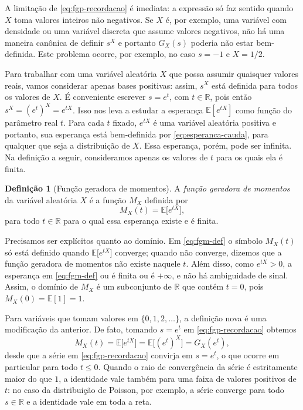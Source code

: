 \documentclass[12pt,portuguese]{article}
\theoremstyle{definition}
\newtheorem{definition}[definition]{Definição}
\theoremstyle{plainexercise}
\theoremstyle{starredexercise}
\theoremstyle{definition}
\begin{document}
A limitação de \eqref{eq:fgp-recordacao} é imediata: a expressão só faz sentido
quando $X$ toma valores inteiros não negativos. Se $X$ é, por exemplo, uma
variável com densidade ou uma variável discreta que assume valores negativos,
não há uma maneira canônica de definir $s^X$ e portanto $G_{X}(s)$ poderia não estar
bem-definida. Este problema ocorre, por exemplo, no caso $s=-1$ e $X=1/2$. 

Para trabalhar com uma variável aleatória $X$ que possa assumir quaisquer
valores reais, vamos considerar apenas bases positivas: assim, $s^X$ está
definida para todos os valores de $X$. É conveniente escrever $s=e^t$, com
$t\in\mathbb{R}$, pois então $s^X=(e^t)^X=e^{tX}$. Isso nos leva a estudar
a esperança $\mathbb{E}[e^{tX}]$ como função do parâmetro real $t$.
Para cada $t$ fixado, $e^{tX}$ é uma variável aleatória positiva e portanto,
sua esperança está bem-definida por \eqref{eq:esperanca-cauda}, para qualquer que
seja a distribuição de $X$. Essa esperança, porém, pode ser infinita.
Na definição a seguir, consideramos apenas os valores de $t$ para os quais
ela é finita.

\begin{definition}[Função geradora de momentos]\label{def:fgm}
A \emph{função geradora de momentos} da variável aleatória $X$ é a função
$M_X$ definida por
\begin{equation}\label{eq:fgm-def}
M_X(t) = \mathbb{E}\bigl[e^{tX}\bigr],
\end{equation}
para todo $t\in\mathbb{R}$ para o qual essa esperança existe e é finita.
\end{definition}

Precisamos ser explícitos quanto ao domínio. Em \eqref{eq:fgm-def} o símbolo
$M_X(t)$ só está definido quando $\mathbb{E}\bigl[e^{tX}\bigr]$ converge; quando
não converge, dizemos que a função geradora de momentos não existe naquele $t$.
Além disso, como $e^{tX}>0$, a esperança em \eqref{eq:fgm-def} ou é finita ou é
$+\infty$, e não há ambiguidade de sinal. Assim, o domínio de $M_X$ é um
subconjunto de $\mathbb{R}$ que contém $t=0$, pois
$M_X(0)=\mathbb{E}[1]=1$.

Para variáveis que tomam valores em $\{0,1,2,\ldots\}$, a definição nova é uma
modificação da anterior. De fato, tomando $s=e^t$ em
\eqref{eq:fgp-recordacao} obtemos
\begin{equation}\label{eq:fgm-fgp}
M_X(t) = \mathbb{E}\bigl[e^{tX}\bigr] = \mathbb{E}\bigl[(e^t)^X\bigr] = G_X(e^t),
\end{equation}
desde que a série em \eqref{eq:fgp-recordacao} convirja em $s=e^t$, o que
ocorre em particular para todo $t\leqslant 0$. Quando o raio de convergência da
série é estritamente maior do que $1$, a identidade vale também para uma faixa
de valores positivos de $t$: no caso da distribuição de Poisson, por exemplo, a
série converge para todo $s\in\mathbb{R}$ e a identidade vale em toda a reta.
\end{document}
